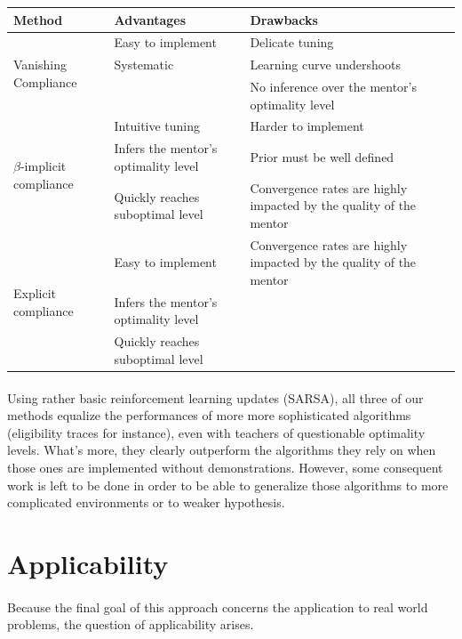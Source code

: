 \documentclass[a4paper]{report}
\begin{document}
{{{			\begin{center}
				\begin{tabularx}{\textwidth}{|X|X|X|}
					\hline
					\textbf{Method} & \textbf{Advantages} & \textbf{Drawbacks}\\
					\hline
					\multirow{3}{*}{Vanishing Compliance} & Easy to implement & Delicate tuning\\
												   & Systematic & Learning curve undershoots \\
												   & & No inference over the mentor's optimality level \\
					\hline
					\multirow{3}{*}{$\beta$-implicit compliance} &  Intuitive tuning & Harder to implement \\
													  & Infers the mentor's optimality level & Prior must be well defined \\
													  & Quickly reaches suboptimal level & Convergence rates are highly impacted by the quality of the mentor \\ 
					\hline
					\multirow{3}{*}{Explicit compliance} &  Easy to implement &  Convergence rates are highly impacted by the quality of the mentor \\
					& Infers the mentor's optimality level  & \\
					& Quickly reaches suboptimal level  & \\
					\hline
				\end{tabularx}
			\end{center}
			
			\paragraph{} Using rather basic reinforcement learning updates (SARSA), all three of our methods equalize the performances of more more sophisticated algorithms (eligibility traces for instance), even with teachers of questionable optimality levels. What's more, they clearly outperform the algorithms they rely on when those ones are implemented without demonstrations. However, some consequent work is left to be done in order to be able to generalize those algorithms to more complicated environments or to weaker hypothesis. 
		}
		\section{Applicability}
		{
			\paragraph{} Because the final goal of this approach concerns the application to real world problems, the question of applicability arises. 
			
}}}
\end{document}
